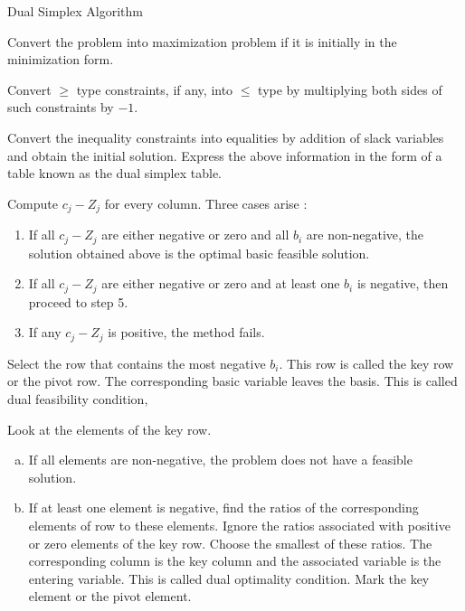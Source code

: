 \begin{frame}{Dual Simplex Algorithm}
  \begin{description} \justifying \parskip3mm
  \item<only@1>[Step 1.] \alert{Convert the problem into maximization problem} if it is initially in the minimization form.
  \item<only@1>[Step 2.] Convert $\geq$ type constraints, if any, into $\leq$ type by multiplying both sides of such
constraints by $-1$.
\item<only@1>[Step 3.] Convert the inequality constraints into equalities by addition of slack variables and obtain the initial solution. Express the above information in the form of a \alert{table known as the dual simplex table}.
\item<only@2>[Step 4.]  Compute $c_j - Z_j$ for every column. Three cases arise :
  \begin{enumerate} \justifying 
  \item  If all $c_j - Z_j$ are either negative or zero and all $b_i$ are non-negative, \alert{the solution obtained
above is the optimal basic feasible solution.}
\item If all $c_j - Z_j$ are either negative or zero and at least one $b_i$ is negative, then proceed to
step 5.
\item  If any $c_j - Z_j$ is positive, the method fails.
  \end{enumerate}
\item<only@2>[Step 5.]  Select the row that contains \alert{the most negative $b_i$}. This row is called the key row or
the pivot row. The corresponding basic variable leaves the basis. This is called dual feasibility
condition,
\item<only@3>[Step 6.]  Look at the elements of the key row.
  \begin{enumerate}[a)] \justifying
  \item  \alert{If all elements are non-negative, the problem does not have a feasible solution}.
  \item  \alert{If at least one element is negative}, find the ratios of the corresponding elements of row to these elements. \alert{Ignore the ratios associated with positive or zero elements of the key row}. Choose the smallest of these ratios. The corresponding column is the key column and the associated variable is the entering variable. This is called dual optimality condition. Mark the key element or the pivot element.
  \end{enumerate}
  \end{description}
\end{frame}

